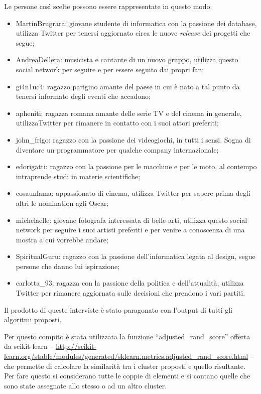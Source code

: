 Le persone così scelte possono essere rappresentate in questo modo:
\begin{itemize}
	\item MartinBrugrara: giovane studente di informatica con la passione dei database, utilizza Twitter per tenersi aggiornato circa le nuove \emph{release} dei progetti che segue;
	\item AndreaDellera: musicista e cantante di un nuovo gruppo, utilizza questo social network per seguire e per essere seguito dai propri fan;
	\item gi4n1uc4: ragazzo parigino amante del paese in cui è nato a tal punto da tenersi informato degli eventi che accadono;
	\item apheniti; ragazza romana amante delle serie TV e del cinema in generale, utilizzaTwitter per rimanere in contatto con i suoi attori preferiti;
	\item john\_frigo: ragazzo con la passione dei videogiochi, in tutti i sensi. Sogna di diventare un programmatore per qualche company internazionale;
	\item edorigatti: ragazzo con la passione per le macchine e per le moto, al contempo intraprende studi in materie scientifiche;
	\item cosaunlama: appassionato di cinema, utilizza Twitter per sapere prima degli altri le nomination agli Oscar;
	\item michelaelle: giovane fotografa interessata di belle arti, utilizza questo social network per seguire i suoi artisti preferiti e per venire a conoscenza di una mostra a cui vorrebbe andare; 
	\item SpiritualGuru: ragazzo con la passione dell'informatica legata al design, segue persone che danno lui ispirazione;
	\item carlotta\_93: ragazza con la passione della politica e dell'attualità, utilizza Twitter per rimanere aggiornata sulle decisioni che prendono i vari partiti.
\end{itemize}

Il prodotto di queste interviste è stato paragonato con l'output di tutti gli algoritmi proposti. 

Per questo compito è stata utilizzata la funzione ``adjusted\_rand\_score'' offerta da scikit-learn -- \url{http://scikit-learn.org/stable/modules/generated/sklearn.metrics.adjusted_rand_score.html} -- che permette di calcolare la similarità tra i cluster proposti e quello risultante. Per fare questo si considerano tutte le coppie di elementi e si contano quelle che sono state assegnate allo stesso o ad un altro cluster.

